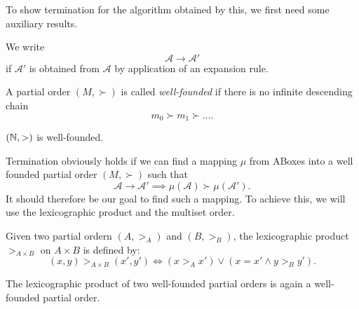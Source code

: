 To show termination for the algorithm obtained by this, we first need some auxiliary results.
\begin{notation}
	We write  \[
	\mathcal{A} \to \mathcal{A}'
	\]
	if $\mathcal{A}'$ is obtained from $\mathcal{A}$ by application of an expansion rule.
\end{notation}
\begin{definition*}
	A partial order $(M, \succ)$ is called \textit{well-founded}
	if there is no infinite descending chain
	\[
		m_0 \succ m_1 \succ \ldots
	.\]
\end{definition*}
\begin{example}
	$(\mathbb{N}, >)$ is well-founded.
\end{example}
Termination obviously holds if we can find a mapping $\mu$ from ABoxes into a well founded partial order  $(M, \succ)$ such that
\[
	\mathcal{A} \to \mathcal{A}' \implies \mu (\mathcal{A}) \succ \mu (\mathcal{A}')
.\]
It should therefore be our goal to find such a mapping.
To achieve this, we will use the lexicographic product and the multiset order.

\begin{definition*}
	Given two partial ordern $(A, >_A)$ and $(B, >_B)$, the lexicographic product $>_{A \times B}$ on $A \times B$ is defined by:
	\[
		(x,y) >_{A \times B} (x',y') \iff (x >_A x') \lor (x = x' \land y >_B y')
	.\]
\end{definition*}
\begin{theorem*}
	The lexicographic product of two well-founded partial orders is again a well-founded partial order.
\end{theorem*}

